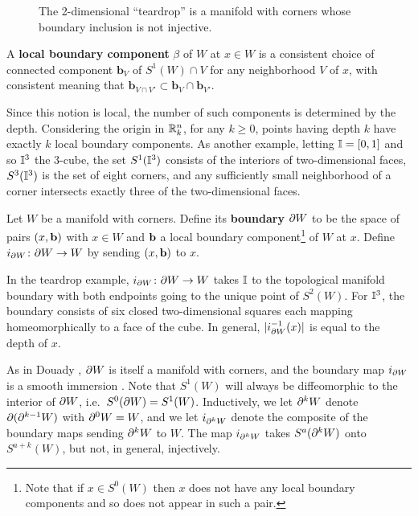 \begin{figure}[h]
	
	\caption{The 2-dimensional ``teardrop'' is a manifold with corners whose boundary inclusion is not injective.}
	\label{F: teardrop}
\end{figure}

\begin{definition}
	A \textbf{local boundary component} $\beta$ of $W$ at $x \in W$ is a consistent choice of connected component $\mathbf{b}_V$ of $S^1(W) \cap V$ for any neighborhood $V$ of $x$, with consistent meaning that $\mathbf{b}_{V \cap V'} \subset \mathbf{b}_{V} \cap \mathbf{b}_{V'}$.
\end{definition}

Since this notion is local, the number of such components is determined by the depth.
Considering the origin in $\mathbb{R}^n_k$, for any $k \geq 0$, points having depth $k$ have exactly $k$ local boundary components.
As another example, letting $\mathbb{I} = [0,1]$ and so $\mathbb{I}^3$ the 3-cube, the set $S^1(\mathbb{I}^3)$ consists of the interiors of two-dimensional faces, $S^3(\mathbb{I}^3)$ is the set of eight corners, and any sufficiently small neighborhood of a corner intersects exactly three of the two-dimensional faces.

\begin{definition}\label{D: MWC boundary}
	Let $W$ be a manifold with corners.
	Define its \textbf{boundary} $\partial W$ to be the space of pairs $(x, \mathbf{b})$ with $x \in W$ and $\mathbf{b}$ a local boundary component\footnote{Note that if $x \in S^0(W)$ then $x$ does not have any local boundary components and so does not appear in such a pair.} of $W$ at $x$.
	Define $i_{\partial W} \colon \partial W \to W$ by sending $(x,\mathbf{b})$ to $x$.
\end{definition}

In the teardrop example, $i_{\partial W} \colon \partial W \to W$ takes $\mathbb{I}$ to the topological manifold boundary with both endpoints going to the unique point of $S^2(W)$.
For $\mathbb{I}^3$, the boundary consists of six closed two-dimensional squares each mapping homeomorphically to a face of the cube.
In general, $|i_{\partial W}^{-1}(x)|$ is equal to the depth of $x$.

As in Douady \cite{Doua61}, $\partial W$ is itself a manifold with corners, and the boundary map $i_{\partial W}$ is a smooth immersion \cite[Theorem 3.4]{Joy12}. Note that $S^1(W)$ will always be diffeomorphic to the interior of $\partial W$, i.e.\ $S^0(\partial W) = S^1(W)$.
Inductively, we let $\partial^k W$ denote $\partial (\partial^{k-1} W)$ with $\partial^0 W = W$, and we let $i_{\partial^k W}$ denote the composite of the boundary maps sending $\partial^k W$ to $W$. The map $i_{\partial^k W}$ takes $S^a(\partial^k W)$ onto $S^{a+k}(W)$, but not, in general, injectively.

